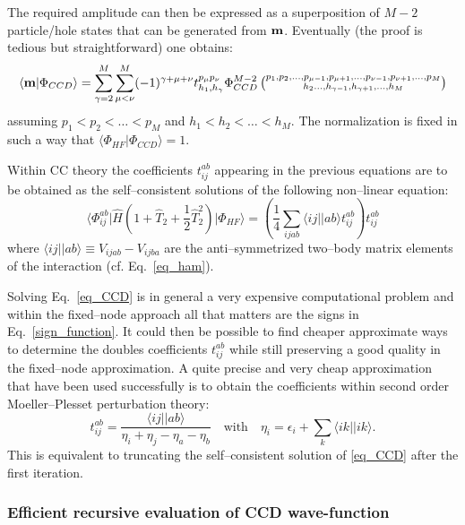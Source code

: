 The required amplitude can then be expressed as a superposition of $M-2$ particle/hole states
that can be generated from ${\bf m}$. Eventually (the proof is tedious but straightforward) one obtains:
\begin{equation}
\langle {\bf m}\vert \Phi_{CCD}\rangle = \sum_{\gamma=2}^M\sum_{\mu<\nu}^M (-1)^{\gamma+\mu+\nu}t^{p_\mu p_\nu}_{h_1,h_\gamma}\Phi_{CCD}^{M-2}\left(\substack{p_1,p_2,\dots,p_{\mu-1},p_{\mu+1},\dots,p_{\nu-1},p_{\nu+1},\dots,p_M\\ h_2\dots,h_{\gamma-1},h_{\gamma+1},\dots,h_M}\right)
\end{equation}
assuming $p_1<p_2<\dots<p_M$ and $h_1<h_2<\dots<h_M$. The normalization is fixed in such a way 
that $\langle \Phi_{HF}\vert \Phi_{CCD}\rangle = 1$.

Within CC theory the coefficients $t_{ij}^{ab}$ appearing in the previous equations are to be obtained as the self--consistent solutions
of the following non--linear equation:
\begin{equation}
\label{eq_CCD}
\langle \Phi^{ab}_{ij} \lvert \hat{H} \left( 1+\hat{T}_2+\frac{1}{2}\hat{T}^2_2\right) \rvert\Phi_{HF} \rangle= \left( \frac{1}{4}\sum_{ijab} \langle ij\lvert\rvert ab\rangle t_{ij}^{ab}\right) t_{ij}^{ab}
\end{equation}
where $\langle ij\lvert\rvert ab\rangle \equiv V_{ijab}-V_{ijba} $ are the anti--symmetrized two--body matrix elements of the interaction (cf. Eq.~\eqref{eq_ham}).

Solving Eq.~\eqref{eq_CCD} is in general a very expensive computational problem and within 
the fixed--node approach all that matters are the signs in Eq.~\eqref{sign_function}. It could 
then be possible to find cheaper approximate ways to determine the doubles coefficients $t_{ij}^{ab}$ 
while still preserving a good quality in the fixed--node approximation. A quite precise and very
cheap approximation that have been used successfully is to obtain the coefficients within second 
order Moeller--Plesset perturbation theory:
\begin{equation}
t_{ij}^{ab} = \frac{\langle ij\lvert\rvert ab\rangle }{\eta_i+\eta_j-\eta_a-\eta_b} \quad  \text{with} \quad \eta_i=\epsilon_i+\sum_k \langle ik\lvert\rvert ik\rangle .
\end{equation}
This is equivalent to truncating the self--consistent solution of \eqref{eq_CCD} after the first iteration.

\subsubsection{Efficient recursive evaluation of CCD wave-function}

